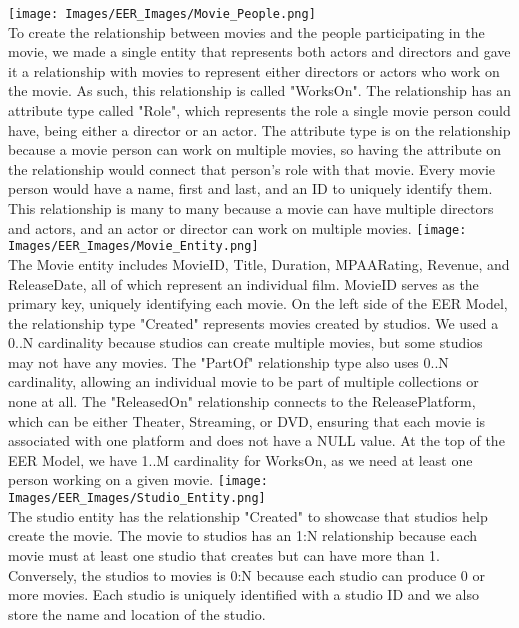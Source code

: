 \documentclass[12pt]{article}
\begin{document}
{
    \captionsetup[figure]{labelformat=empty}
    \centering
    \texttt{[image: Images/EER\_Images/Movie\_People.png]} \\
    {
        To create the relationship between movies and the people participating in the movie, we made a single entity that represents both actors and directors and gave it a relationship with movies to represent either directors or actors who work on the movie. As such, this relationship is called "WorksOn". The relationship has an attribute type called "Role", which represents the role a single movie person could have, being either a director or an actor. The attribute type is on the relationship because a movie person can work on multiple movies, so having the attribute on the relationship would connect that person's role with that movie. Every movie person would have a name, first and last, and an ID to uniquely identify them. This relationship is many to many because a movie can have multiple directors and actors, and an actor or director can work on multiple movies. 
    }
    \vspace{10pt} 
    \texttt{[image: Images/EER\_Images/Movie\_Entity.png]} \\
    {
        The Movie entity includes MovieID, Title, Duration, MPAARating, Revenue, and ReleaseDate, all of which represent an individual film. MovieID serves as the primary key, uniquely identifying each movie. On the left side of the EER Model, the relationship type "Created" represents movies created by studios. We used a 0..N cardinality because studios can create multiple movies, but some studios may not have any movies. The "PartOf" relationship type also uses 0..N cardinality, allowing an individual movie to be part of multiple collections or none at all. The "ReleasedOn" relationship connects to the ReleasePlatform, which can be either Theater, Streaming, or DVD, ensuring that each movie is associated with one platform and does not have a NULL value. At the top of the EER Model, we have 1..M cardinality for WorksOn, as we need at least one person working on a given movie.
    }
    \vspace{10pt} 
    \texttt{[image: Images/EER\_Images/Studio\_Entity.png]} \\
    {
        The studio entity has the relationship "Created" to showcase that studios help create the movie. The movie to studios has an 1:N relationship because each movie must at least one studio that creates but can have more than 1. Conversely, the studios to movies is 0:N because each studio can produce 0 or more movies. Each studio is uniquely identified with a studio ID and we also store the name and location of the studio. 
}}
\end{document}
